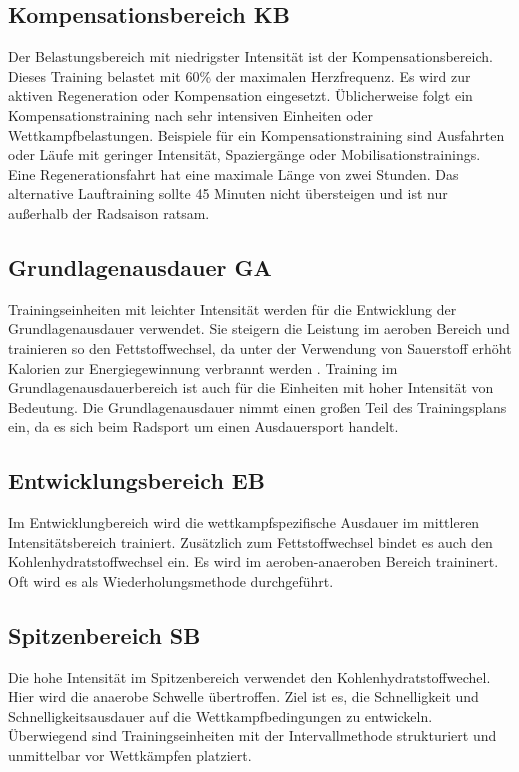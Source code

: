 \subsection{Kompensationsbereich KB}
Der Belastungsbereich mit niedrigster Intensität ist der Kompensationsbereich. Dieses Training belastet mit 60\% der maximalen Herzfrequenz. Es wird zur aktiven Regeneration oder Kompensation eingesetzt. Üblicherweise folgt ein Kompensationstraining nach sehr intensiven Einheiten oder Wettkampfbelastungen. Beispiele für ein Kompensationstraining sind Ausfahrten oder Läufe mit geringer Intensität, Spaziergänge oder Mobilisationstrainings. \cite[31-32]{Radsporttraining}
Eine Regenerationsfahrt hat eine maximale Länge von zwei Stunden. Das alternative Lauftraining sollte 45 Minuten nicht übersteigen und ist nur außerhalb der Radsaison ratsam.
\subsection{Grundlagenausdauer GA}
Trainingseinheiten mit leichter Intensität werden für die Entwicklung der Grundlagenausdauer verwendet. Sie steigern die Leistung im aeroben Bereich und trainieren so den Fettstoffwechsel, da unter der Verwendung von Sauerstoff erhöht Kalorien zur Energiegewinnung verbrannt werden .  
Training im Grundlagenausdauerbereich ist auch für die Einheiten mit hoher Intensität von Bedeutung. Die Grundlagenausdauer nimmt einen großen Teil des Trainingsplans ein, da es sich beim Radsport um einen Ausdauersport handelt.
\subsection{Entwicklungsbereich EB}
Im Entwicklungbereich wird die wettkampfspezifische Ausdauer im mittleren Intensitätsbereich trainiert. Zusätzlich zum Fettstoffwechsel bindet es auch den Kohlenhydratstoffwechsel ein. Es wird im aeroben-anaeroben Bereich traininert. Oft wird es als Wiederholungsmethode durchgeführt.
\subsection{Spitzenbereich SB}
Die hohe Intensität im Spitzenbereich verwendet den Kohlenhydratstoffwechel. Hier wird die anaerobe Schwelle übertroffen. Ziel ist es, die Schnelligkeit und Schnelligkeitsausdauer auf die Wettkampfbedingungen zu entwickeln. Überwiegend sind Trainingseinheiten mit der Intervallmethode strukturiert und unmittelbar vor Wettkämpfen platziert.
